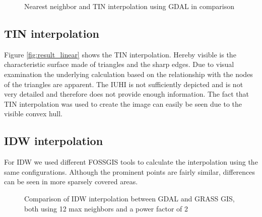 \begin{figure}
	\centering
	\hfill
	\caption{Nearest neighbor and TIN interpolation using GDAL in comparison}
	\label{fig:result_nearest_linear}
\end{figure}


\subsection{TIN interpolation}

Figure \ref{fig:result_linear} shows the TIN interpolation. Hereby visible is the characteristic surface made of triangles and the sharp edges. Due to visual examination the underlying calculation based on the relationship with the nodes of the triangles are apparent. The IUHI is not sufficiently depicted and is not very detailed and therefore does not provide enough information. The fact that TIN interpolation was used to create the image can easily be seen due to the visible convex hull.


\subsection{IDW interpolation}

For IDW we used different FOSSGIS tools to calculate the interpolation using the same configurations. Although the prominent points are fairly similar, differences can be seen in more sparsely covered areas.

\begin{figure}
	\centering
	\hfill
	\caption[Comparison of IDW interpolation between GDAL and GRASS GIS]{Comparison of IDW interpolation between GDAL and GRASS GIS, both using 12 max neighbors and a power factor of 2}
	\label{fig:result_idw_gdal_grass}
\end{figure}


